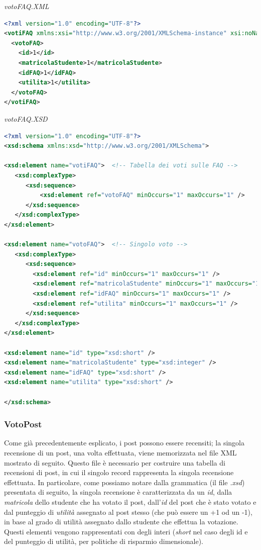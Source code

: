 \documentclass [a4paper,11pt]{book}
\begin{document}
\medskip

\emph{votoFAQ.XML}

\label{sec:votoFAQ}

\begin{lstlisting}[language=XML]
<?xml version="1.0" encoding="UTF-8"?>
<votiFAQ xmlns:xsi="http://www.w3.org/2001/XMLSchema-instance" xsi:noNamespaceSchemaLocation="votoFAQ.xsd">
  <votoFAQ>
    <id>1</id>
    <matricolaStudente>1</matricolaStudente>
    <idFAQ>1</idFAQ>
    <utilita>1</utilita>
  </votoFAQ>
</votiFAQ>
\end{lstlisting}

\emph{votoFAQ.XSD}

\begin{lstlisting}[language=XML]
<?xml version="1.0" encoding="UTF-8"?>
<xsd:schema xmlns:xsd="http://www.w3.org/2001/XMLSchema">

<xsd:element name="votiFAQ">  <!-- Tabella dei voti sulle FAQ -->
   <xsd:complexType> 
      <xsd:sequence>
	      <xsd:element ref="votoFAQ" minOccurs="1" maxOccurs="1" />
      </xsd:sequence>
   </xsd:complexType>
</xsd:element>

<xsd:element name="votoFAQ">  <!-- Singolo voto -->
   <xsd:complexType> 
      <xsd:sequence>
        <xsd:element ref="id" minOccurs="1" maxOccurs="1" /> 
        <xsd:element ref="matricolaStudente" minOccurs="1" maxOccurs="1" />
        <xsd:element ref="idFAQ" minOccurs="1" maxOccurs="1" /> 
        <xsd:element ref="utilita" minOccurs="1" maxOccurs="1" /> 
      </xsd:sequence>
   </xsd:complexType>
</xsd:element>

<xsd:element name="id" type="xsd:short" />
<xsd:element name="matricolaStudente" type="xsd:integer" />
<xsd:element name="idFAQ" type="xsd:short" />
<xsd:element name="utilita" type="xsd:short" />

</xsd:schema>
\end{lstlisting}

\medskip

\subsubsection{VotoPost}

Come già precedentemente esplicato, i post possono essere recensiti; la singola recensione di un post, una volta effettuata, viene memorizzata nel file XML mostrato di seguito. Questo file è necessario per costruire una tabella di recensioni di post, in cui il singolo record rappresenta la singola recensione effettuata. In particolare, come possiamo notare dalla grammatica (il file \emph{.xsd}) presentata di seguito, la singola recensione è caratterizzata da un \emph{id}, dalla \emph{matricola} dello studente che ha votato il post, dall'\emph{id} del post che è stato votato e dal punteggio di \emph{utilità} assegnato al post stesso (che può essere un +1 od un -1), in base al grado di utilità assegnato dallo studente che effettua la votazione. Questi elementi vengono rappresentati con degli interi (\emph{short} nel caso degli id e del punteggio di utilità, per politiche di risparmio dimensionale).
\end{document}
